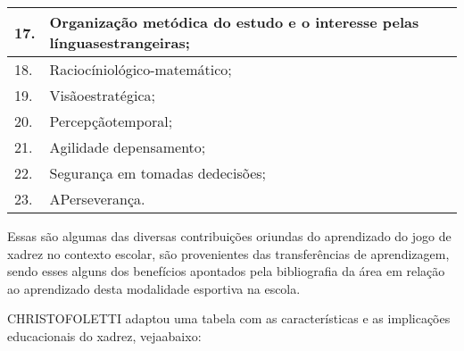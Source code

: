 \documentclass[article,12pt,onesidea,4paper,english,brazil]{abntex2}
\begin{document}
\begin{table}[]
\begin{tabular}{|l|l|}
		17. & Organização metódica do estudo e o interesse pelas línguasestrangeiras;                    \\ \hline
		18. & Raciocíniológico-matemático;                                                               \\ \hline
		19. & Visãoestratégica;                                                                          \\ \hline
		20. & Percepçãotemporal;                                                                         \\ \hline
		21. & Agilidade depensamento;                                                                    \\ \hline
		22. & Segurança em tomadas dedecisões;                                                           \\ \hline
		23. & APerseverança.                                                                             \\ \hline
	\end{tabular}
\end{table}

\FloatBarrier

Essas são algumas das diversas contribuições oriundas do aprendizado do jogo de xadrez no contexto escolar, são provenientes das transferências de aprendizagem, sendo esses alguns dos benefícios apontados pela bibliografia da área em relação ao aprendizado desta modalidade esportiva na escola.

CHRISTOFOLETTI	adaptou	uma	tabela	com	as	características	e	as implicações educacionais do xadrez, vejaabaixo:

\captionsetup{width=17cm}
\end{document}

